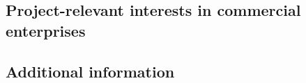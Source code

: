 \documentclass[10pt,fleqn,twoside]{article}
\begin{document}
\todo{[Text]}

\subsection{Project-relevant interests in commercial enterprises}

\todo{[Text]}


\subsection{Additional information}

\todo{[Text]}
\end{document}
